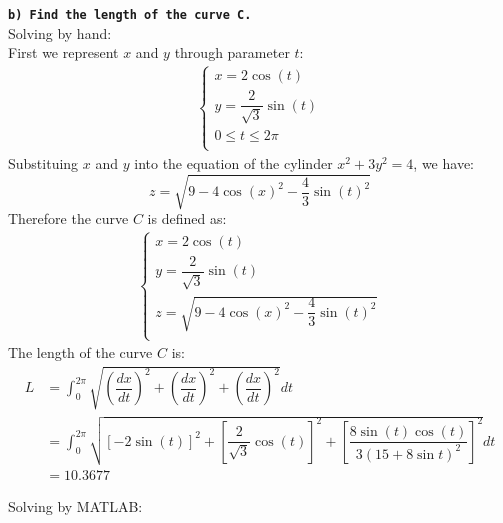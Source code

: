 \textbf{ \texttt{b) Find the length of the curve C.} }\\

Solving by hand:\\
First we represent $x$ and $y$ through parameter $t$:
\begin{align}
  \begin{cases}
    x = 2\cos(t) \\
    y = \dfrac{2}{\sqrt{3}}\sin(t) \\
    0 \leq t \leq 2\pi\\
  \end{cases}
\end{align}
Substituing $x$ and $y$ into the equation of the cylinder $x^2 + 3y^2 = 4$, we have:
$$ z = \sqrt{  9 - 4\cos(x)^2 - \dfrac{4}{3}\sin(t)^2  } $$
Therefore the curve $C$ is defined as:
\begin{align}
  \begin{cases}
    x = 2\cos(t) \\
    y = \dfrac{2}{\sqrt{3}}\sin(t) \\
    z = \sqrt{  9 - 4\cos(x)^2 - \dfrac{4}{3}\sin(t)^2  } \\
  \end{cases}
\end{align}
The length of the curve $C$ is:
\begin{align*}
  L &= \int_{0}^{2\pi}\sqrt{\left(\dfrac{dx}{dt}\right)^2 + \left(\dfrac{dx}{dt}\right)^2 + \left(\dfrac{dx}{dt}\right)^2} dt \\
    &= \int_{0}^{2\pi}\sqrt{[-2\sin(t)]^2 + \left[\dfrac{2}{\sqrt{3}}\cos(t) \right]^2 + \left[\dfrac{8\sin(t)\cos(t)}{ 3(15+8\sin t)^2 }\right]^2} dt \\
    &= 10.3677
\end{align*}



Solving by MATLAB:\\

